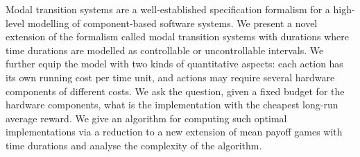 Modal transition systems are a well-established specification formalism for
a high-level modelling of component-based software systems.
We present a novel extension of the formalism called
modal transition systems with durations where time durations are 
modelled as controllable
or uncontrollable intervals. We further equip the model with two
kinds of quantitative aspects: each action has its own
running cost per time unit, and actions may 
require several hardware components of different costs.
We ask the question, given a fixed budget for
the hardware components, what is the implementation with the cheapest long-run average reward. We give an algorithm for computing such optimal 
implementations via a reduction to a new extension of mean payoff games 
with time durations and analyse the complexity of the algorithm.